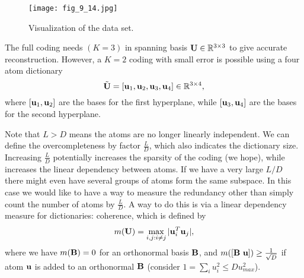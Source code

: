 \documentclass[../book-template.tex]{subfiles}
\begin{document}
\begin{figure}[h] 
	\centering 
	\texttt{[image: fig\_9\_14.jpg]} 
	\caption{Visualization of the data set.}\label{fig_9_14}
\end{figure}
\par The full coding needs $(K=3)$ in spanning basis ${\bf U}\in \mathbb{R}^{3\times 3}$ to give accurate reconstruction. However, a $K=2$ coding with small error is possible using a four atom dictionary
\begin{equation*}
	\tilde{\bf U}=[{\bf u}_1,{\bf u}_2,{\bf u}_3,{\bf u}_4]\in \mathbb{R}^{3\times 4},
\end{equation*}
where $[{\bf u}_1,{\bf u}_2]$ are the bases for the first hyperplane, while $[{\bf u}_3,{\bf u}_4]$ are the bases for the second hyperplane. 
\par Note that $L>D$ means the atoms are no longer linearly independent. We can define the overcompleteness by factor $\frac{L}{D}$, which also indicates the dictionary size. Increasing $\frac{L}{D}$ potentially increases the sparsity of the coding (we hope), while increases the linear dependency between atoms. If we have a very large $L/D$ there might even have several groups of atoms form the same subspace.
In this case we would like to have a way to measure the redundancy other than simply count the number of atoms by $\frac{L}{D}$. A way to do this is via a linear dependency measure for dictionaries: coherence, which is defined by 
\begin{equation*}
	m({\bf U})=\max_{i,j:i\neq j}|{\bf u}_i^T{\bf u}_j|,
\end{equation*}
where we have $m({\bf B})=0$ for an orthonormal basis ${\bf B}$, and $m([{\bf B}\ {\bf u}])\geq \frac{1}{\sqrt{D}}$ if atom ${\bf u}$ is added to an orthonormal ${\bf B}$ (consider $1=\sum_i u_i^2\leq D u_{max}^2$).  
\end{document}
